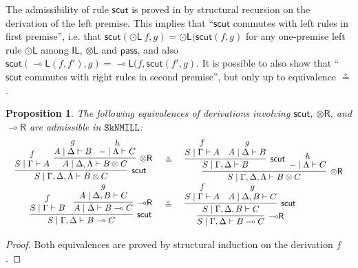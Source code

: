 \documentclass[sn-mathphys-num]{sn-jnl}%
\newcommand{\GG}{\Gamma}
\newcommand{\GD}{\Delta}
\newcommand{\GL}{\Lambda}
\newcommand{\vd}{\vdash}
\newcommand{\tl}{\otimes \mathsf{L}}
\newcommand{\tr}{\otimes\mathsf{R}}
\newcommand{\pass}{\mathsf{pass}}
\newcommand{\unitl}{\mathsf{IL}}
\newcommand{\ot}{\otimes}
\newcommand{\lolli}{\multimap}
\newcommand{\lleft}{{\lolli}\mathsf{L}}
\newcommand{\lright}{{\lolli}\mathsf{R}}
\newcommand{\SkNMILL}{$\mathtt{SkNMILL}$}
\newcommand{\mf}[1]{\mathsf{#1}}
\theoremstyle{thmstyleone}%
\newtheorem{proposition}[theorem]{Proposition}%
\theoremstyle{thmstyletwo}%
\theoremstyle{thmstylethree}%
\begin{document}
The admissibility of rule $\mf{scut}$ is proved in \cite{UVW:protsn,wan2024} by structural recursion on the derivation of the left premise.
This implies that ``$\mf{scut}$ commutes with left rules in first premise'', i.e. that $\mf{scut}(\odot\mathsf{L}\ f, g) = \odot\mathsf{L} (\mf{scut}(f, g)$ for any one-premise left rule $\odot\mathsf{L}$ among $\unitl$, $\tl$ and $\pass$, and also $\mf{scut}(\lleft (f,f'), g) = \lleft (f,\mf{scut}(f', g)$.
It is possible to also show that ``$\mf{scut}$ commutes with right rules in second premise'', but only up to equivalence $\circeq$.
\begin{proposition}\label{eq:scut:otr:-or}
The following equivalences of derivations involving $\mf{scut}$, $\tr$, and $\lright$ are admissible in \SkNMILL:
  \begin{displaymath}
  \begin{array}{rcl}
  \begin{array}{c}
    \infer[\mf{scut}]{S \mid \GG , \GD , \GL \vd B \ot C}{
      \deduce{S \mid \GG \vd A}{f}
      &
        \!\!\!
      \infer[\tr]{A \mid \GD , \GL \vd B \ot C}{
        \deduce{A \mid \GD \vd B}{g}
        & \!
        \deduce{{-} \mid \GL \vd C}{h}
      }
    }
  \end{array}
  &\circeq &
    \begin{array}{c}
      \infer[\tr]{S \mid \GG , \GD , \GL \vd B \ot C}{
        \infer[\mf{scut}]{S \mid \GG , \GD \vd B}{
          \deduce{S \mid \GG \vd A}{f}
          &
          \deduce{A \mid \GD \vd B}{g}
        }
        &
        \!\!\!
        \deduce{{-} \mid \GL \vd C}{h}
      }
    \end{array}
\\[20pt]
  \begin{array}{c}
    \infer[\mf{scut}]{S \mid \GG , \GD \vd B \lolli C}{
      \deduce{S \mid \GG \vd B}{f}
      &
      \infer[\lright]{A \mid \GD \vd B \lolli C}{
        \deduce{A \mid \GD , B \vd C}{g}
      }
    }
  \end{array}
  &
  \circeq
  &
    \begin{array}{c}
      \infer[\lright]{S \mid \GG , \GD \vd B \lolli C}{
        \infer[\mf{scut}]{S \mid \GG , \GD , B \vd C}{
          \deduce{S \mid \GG \vd A}{f}
          &
          \deduce{A \mid \GD , B \vd C}{g}
        }
        }
    \end{array}
  \end{array}
\end{displaymath}
\end{proposition}
\begin{proof}
  Both equivalences are proved by structural induction on the derivation $f$.
\end{proof}
\end{document}

